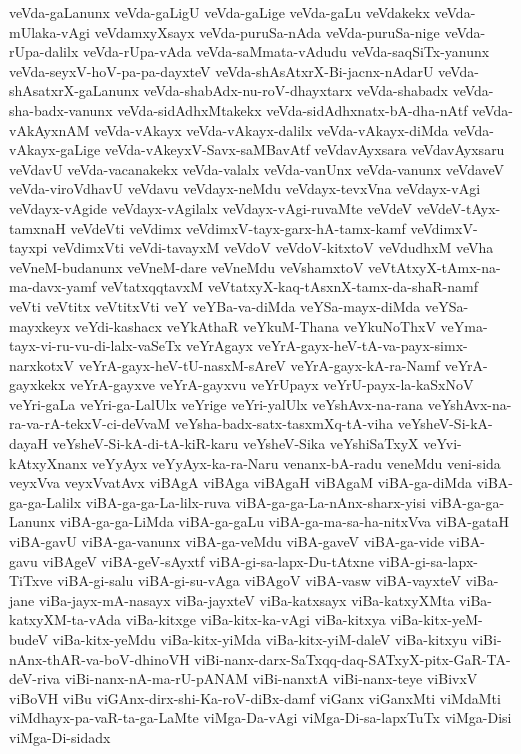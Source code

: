 {veVda-gaLanunx
veVda-gaLigU
veVda-gaLige
veVda-gaLu
veVdakekx
veVda-mUlaka-vAgi
veVdamxyXsayx
veVda-puruSa-nAda
veVda-puruSa-nige
veVda-rUpa-dalilx
veVda-rUpa-vAda
veVda-saMmata-vAdudu
veVda-saqSiTx-yanunx
veVda-seyxV-hoV-pa-pa-dayxteV
veVda-shAsAtxrX-Bi-jacnx-nAdarU
veVda-shAsatxrX-gaLanunx
veVda-shabAdx-nu-roV-dhayxtarx
veVda-shabadx
veVda-sha-badx-vanunx
veVda-sidAdhxMtakekx
veVda-sidAdhxnatx-bA-dha-nAtf
veVda-vAkAyxnAM
veVda-vAkayx
veVda-vAkayx-dalilx
veVda-vAkayx-diMda
veVda-vAkayx-gaLige
veVda-vAkeyxV-Savx-saMBavAtf
veVdavAyxsara
veVdavAyxsaru
veVdavU
veVda-vacanakekx
veVda-valalx
veVda-vanUnx
veVda-vanunx
veVdaveV
veVda-viroVdhavU
veVdavu
veVdayx-neMdu
veVdayx-tevxVna
veVdayx-vAgi
veVdayx-vAgide
veVdayx-vAgilalx
veVdayx-vAgi-ruvaMte
veVdeV
veVdeV-tAyx-tamxnaH
veVdeVti
veVdimx
veVdimxV-tayx-garx-hA-tamx-kamf
veVdimxV-tayxpi
veVdimxVti
veVdi-tavayxM
veVdoV
veVdoV-kitxtoV
veVdudhxM
veVha
veVneM-budanunx
veVneM-dare
veVneMdu
veVshamxtoV
veVtAtxyX-tAmx-na-ma-davx-yamf
veVtatxqqtavxM
veVtatxyX-kaq-tAsxnX-tamx-da-shaR-namf
veVti
veVtitx
veVtitxVti
veY
veYBa-va-diMda
veYSa-mayx-diMda
veYSa-mayxkeyx
veYdi-kashacx
veYkAthaR
veYkuM-Thana
veYkuNoThxV
veYma-tayx-vi-ru-vu-di-lalx-vaSeTx
veYrAgayx
veYrA-gayx-heV-tA-va-payx-simx-narxkotxV
veYrA-gayx-heV-tU-nasxM-sAreV
veYrA-gayx-kA-ra-Namf
veYrA-gayxkekx
veYrA-gayxve
veYrA-gayxvu
veYrUpayx
veYrU-payx-la-kaSxNoV
veYri-gaLa
veYri-ga-LalUlx
veYrige
veYri-yalUlx
veYshAvx-na-rana
veYshAvx-na-ra-va-rA-tekxV-ci-deVvaM
veYsha-badx-satx-tasxmXq-tA-viha
veYsheV-Si-kA-dayaH
veYsheV-Si-kA-di-tA-kiR-karu
veYsheV-Sika
veYshiSaTxyX
veYvi-kAtxyXnanx
veYyAyx
veYyAyx-ka-ra-Naru
venanx-bA-radu
veneMdu
veni-sida
veyxVva
veyxVvatAvx
viBAgA
viBAga
viBAgaH
viBAgaM
viBA-ga-diMda
viBA-ga-ga-Lalilx
viBA-ga-ga-La-lilx-ruva
viBA-ga-ga-La-nAnx-sharx-yisi
viBA-ga-ga-Lanunx
viBA-ga-ga-LiMda
viBA-ga-gaLu
viBA-ga-ma-sa-ha-nitxVva
viBA-gataH
viBA-gavU
viBA-ga-vanunx
viBA-ga-veMdu
viBA-gaveV
viBA-ga-vide
viBA-gavu
viBAgeV
viBA-geV-sAyxtf
viBA-gi-sa-lapx-Du-tAtxne
viBA-gi-sa-lapx-TiTxve
viBA-gi-salu
viBA-gi-su-vAga
viBAgoV
viBA-vasw
viBA-vayxteV
viBa-jane
viBa-jayx-mA-nasayx
viBa-jayxteV
viBa-katxsayx
viBa-katxyXMta
viBa-katxyXM-ta-vAda
viBa-kitxge
viBa-kitx-ka-vAgi
viBa-kitxya
viBa-kitx-yeM-budeV
viBa-kitx-yeMdu
viBa-kitx-yiMda
viBa-kitx-yiM-daleV
viBa-kitxyu
viBi-nAnx-thAR-va-boV-dhinoVH
viBi-nanx-darx-SaTxqq-daq-SATxyX-pitx-GaR-TA-deV-riva
viBi-nanx-nA-ma-rU-pANAM
viBi-nanxtA
viBi-nanx-teye
viBivxV
viBoVH
viBu
viGAnx-dirx-shi-Ka-roV-diBx-damf
viGanx
viGanxMti
viMdaMti
viMdhayx-pa-vaR-ta-ga-LaMte
viMga-Da-vAgi
viMga-Di-sa-lapxTuTx
viMga-Disi
viMga-Di-sidadx
}
